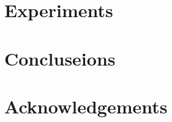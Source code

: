 \documentclass{article}
\begin{document}
\section{Experiments}

\section{Concluseions}

\section{Acknowledgements}



\end{document}

